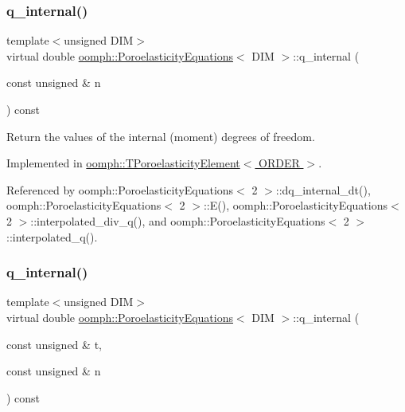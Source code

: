 \subsubsection{\texorpdfstring{q\+\_\+internal()}{q\_internal()}\hspace{0.1cm}{\footnotesize\ttfamily [1/2]}}
{\footnotesize\ttfamily template$<$unsigned D\+IM$>$ \\
virtual double \hyperlink{classoomph_1_1PoroelasticityEquations}{oomph\+::\+Poroelasticity\+Equations}$<$ D\+IM $>$\+::q\+\_\+internal (\begin{DoxyParamCaption}\item[{const unsigned \&}]{n }\end{DoxyParamCaption}) const\hspace{0.3cm}{\ttfamily [pure virtual]}}



Return the values of the internal (moment) degrees of freedom. 



Implemented in \hyperlink{classoomph_1_1TPoroelasticityElement_aea5341bc3d2b89c13a6907b1f10feffc}{oomph\+::\+T\+Poroelasticity\+Element$<$ O\+R\+D\+E\+R $>$}.



Referenced by oomph\+::\+Poroelasticity\+Equations$<$ 2 $>$\+::dq\+\_\+internal\+\_\+dt(), oomph\+::\+Poroelasticity\+Equations$<$ 2 $>$\+::\+E(), oomph\+::\+Poroelasticity\+Equations$<$ 2 $>$\+::interpolated\+\_\+div\+\_\+q(), and oomph\+::\+Poroelasticity\+Equations$<$ 2 $>$\+::interpolated\+\_\+q().

\mbox{\label{classoomph_1_1PoroelasticityEquations_a98223c55e8801bce16d77e4361b2aa64}} 
\subsubsection{\texorpdfstring{q\+\_\+internal()}{q\_internal()}\hspace{0.1cm}{\footnotesize\ttfamily [2/2]}}
{\footnotesize\ttfamily template$<$unsigned D\+IM$>$ \\
virtual double \hyperlink{classoomph_1_1PoroelasticityEquations}{oomph\+::\+Poroelasticity\+Equations}$<$ D\+IM $>$\+::q\+\_\+internal (\begin{DoxyParamCaption}\item[{const unsigned \&}]{t,  }\item[{const unsigned \&}]{n }\end{DoxyParamCaption}) const\hspace{0.3cm}{\ttfamily [pure virtual]}}




